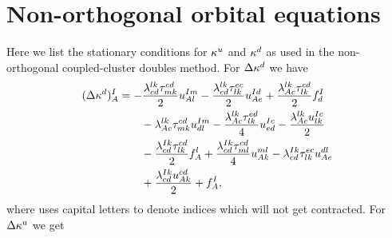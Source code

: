     \section{Non-orthogonal orbital equations}
        \label{app:kappa-equations}
        Here we list the stationary conditions for $\kappa^{u}$ and
        $\kappa^{d}$ as used in the non-orthogonal coupled-cluster doubles
        method.
        For $\Delta \kappa^{d}$ we have \cite{rolf-nocc}
        \begin{align}
            (\Delta \kappa^{d})^{I}_{A}
            &= - \frac{\lambda^{lk}_{cd} \tau^{cd}_{mk}}{2} u^{Im}_{Al}
            - \frac{\lambda^{lk}_{cd} \tau^{ec}_{lk}}{2} u^{Id}_{Ae}
            + \frac{\lambda^{lk}_{Ac} \tau^{cd}_{lk}}{2} f^{I}_{d}
            \nonumber \\
            &\qquad
            - \lambda^{lk}_{Ac} \tau^{cd}_{mk} u^{Im}_{dl}
            - \frac{\lambda^{lk}_{Ac} \tau^{ed}_{lk}}{4} u^{Ic}_{ed}
            - \frac{\lambda^{lk}_{Ac} u^{Ic}_{lk}}{2}
            \nonumber \\
            &\qquad
            - \frac{\lambda^{Ik}_{cd} \tau^{cd}_{lk}}{2} f^{l}_{A}
            + \frac{\lambda^{Ik}_{cd} \tau^{cd}_{ml}}{4} u^{ml}_{Ak}
            - \lambda^{Ik}_{cd} \tau^{ec}_{lk} u^{dl}_{Ae}
            \nonumber \\
            &\qquad
            + \frac{\lambda^{Ik}_{cd} u^{cd}_{Ak}}{2} +
            f^{I}_{A},
        \end{align}
        where \citeauthor{rolf-nocc} \cite{rolf-nocc} uses capital letters to
        denote indices which will not get contracted.
        For $\Delta \kappa^{u}$ we get \cite{rolf-nocc}
